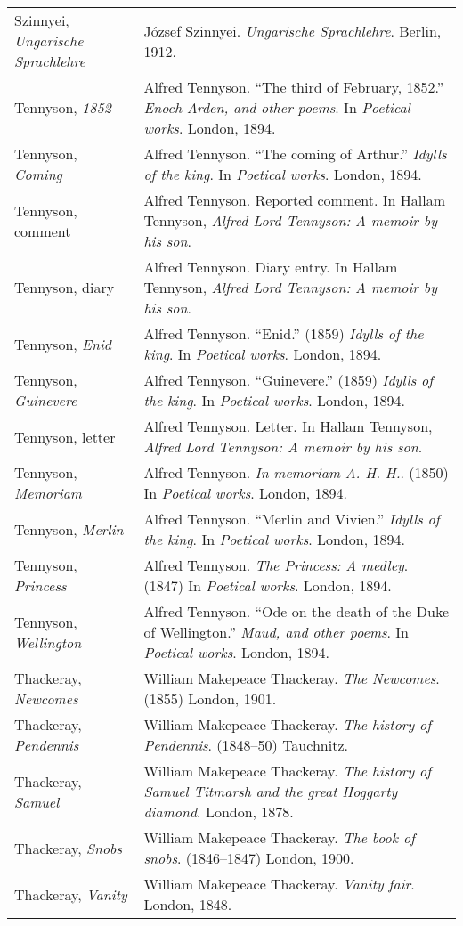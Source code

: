 \begin{longtable}{p{} p{}}
\raggedright{Szinnyei, \textit{Ungarische Sprachlehre}} & József Szinnyei. \textit{Ungarische Sprachlehre}. Berlin, 1912. \\

Tennyson, \textit{1852} & Alfred Tennyson. ``The third of February, 1852.'' \textit{Enoch Arden, and other poems}. In \textit{Poetical works}. London, 1894. \\
Tennyson, \textit{Coming} & Alfred Tennyson. ``The coming of Arthur.'' \textit{Idylls of the king}. In \textit{Poetical works}. London, 1894. \\
Tennyson, comment & Alfred Tennyson. Reported comment. In Hallam Tennyson, \textit{Alfred Lord Tennyson: A memoir by his son}.  \\ %
Tennyson, diary & Alfred Tennyson. Diary entry. In Hallam Tennyson, \textit{Alfred Lord Tennyson: A memoir by his son}. \\ %
Tennyson, \textit{Enid} & Alfred Tennyson. ``Enid.'' (1859) \textit{Idylls of the king}. In \textit{Poetical works}. London, 1894. \\
Tennyson, \textit{Guinevere} & Alfred Tennyson. ``Guinevere.'' (1859) \textit{Idylls of the king}. In \textit{Poetical works}. London, 1894. \\
Tennyson, letter & Alfred Tennyson. Letter. In Hallam Tennyson, \textit{Alfred Lord Tennyson: A memoir by his son}. \\  %
Tennyson, \textit{Memoriam} & Alfred Tennyson. \textit{In memoriam A. H. H.}. (1850) In \textit{Poetical works}. London, 1894. \\
Tennyson, \textit{Merlin} & Alfred Tennyson. ``Merlin and Vivien.'' \textit{Idylls of the king}. In \textit{Poetical works}. London, 1894. \\
Tennyson, \textit{Princess} & Alfred Tennyson. \textit{The Princess: A medley}. (1847) In \textit{Poetical works}. London, 1894. \\
Tennyson, \textit{Wellington} & Alfred Tennyson. ``Ode on the death of the Duke of Wellington.'' \textit{Maud, and other poems}. In \textit{Poetical works}. London, 1894. \\

Thackeray, \textit{Newcomes} & William Makepeace Thackeray. \textit{The Newcomes}. (1855) London, 1901. \\
Thackeray, \textit{Pendennis} & William Makepeace Thackeray. \textit{The history of Pendennis}. (1848--50) Tauchnitz. \\
Thackeray, \textit{Samuel} & William Makepeace Thackeray. \textit{The history of Samuel Titmarsh and the great Hoggarty diamond}. London, 1878. \\
Thackeray, \textit{Snobs} & William Makepeace Thackeray. \textit{The book of snobs}. (1846--1847) London, 1900. \\
Thackeray, \textit{Vanity} & William Makepeace Thackeray. \textit{Vanity fair}. London, 1848. \\


\end{longtable}
